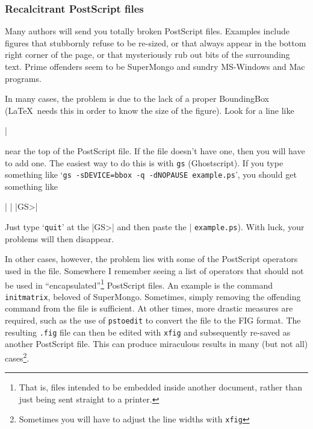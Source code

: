 \documentclass[guide]{rmaa}
\begin{document}
\subsubsection{Recalcitrant PostScript files}
\label{sec:postscript-files}

Many authors will send you totally broken PostScript files. Examples
include figures that stubbornly refuse to be re-sized, or that always
appear in the bottom right corner of the page, or that mysteriously
rub out bits of the surrounding text. Prime offenders seem to be
SuperMongo and sundry MS-Windows and Mac programs. 

In many cases, the problem is due to the lack of a proper BoundingBox
(\LaTeX\ needs this in order to know the size of the figure). Look for
a line like 
\begin{Code}
  |%
\end{Code}
near the top of the PostScript file. If the file doesn't have one,
then you will have to add one. The easiest way to do this is with
\texttt{gs} (Ghostscript). If you type something like `\texttt{gs
  -sDEVICE=bbox -q -dNOPAUSE example.ps}', you should get something
like
\begin{Code}
  |%
  |%
  |GS>| 
\end{Code}
Just type `\texttt{quit}' at the |GS>| and then paste the
|%
\texttt{example.ps}). With luck, your problems will then disappear.

In other cases, however, the problem lies with some of the PostScript
operators used in the file. Somewhere I remember seeing a list of
operators that should not be used in ``encapsulated''\footnote{That
  is, files intended to be embedded inside another document, rather
  than just being sent straight to a printer.} PostScript files. An
example is the command \texttt{initmatrix}, beloved of SuperMongo.
Sometimes, simply removing the offending command from the file is
sufficient. At other times, more drastic measures are required, such
as the use of \texttt{pstoedit} to convert the file to the FIG format.
The resulting \texttt{.fig} file can then be edited with \texttt{xfig}
and subsequently re-saved as another PostScript file. This can produce
miraculous results in many (but not all) cases\footnote{Sometimes you
  will have to adjust the line widths with \texttt{xfig}}. 
\end{document}
